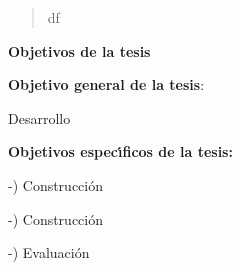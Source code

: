 \begin{abstract}
	df
\end{abstract}
\newpage

\begin{center}
	{\large \textbf{Objetivos de la tesis}}
\end{center}
\qquad 

\qquad \textbf{Objetivo general de la tesis}: 

\qquad 

\qquad Desarrollo 

\qquad 

\qquad \textbf{Objetivos espec\'{\i}ficos de la tesis:}

\qquad 

-) Construcción 
\qquad 

-) Construcción 

\qquad 

-) Evaluación 

\qquad 